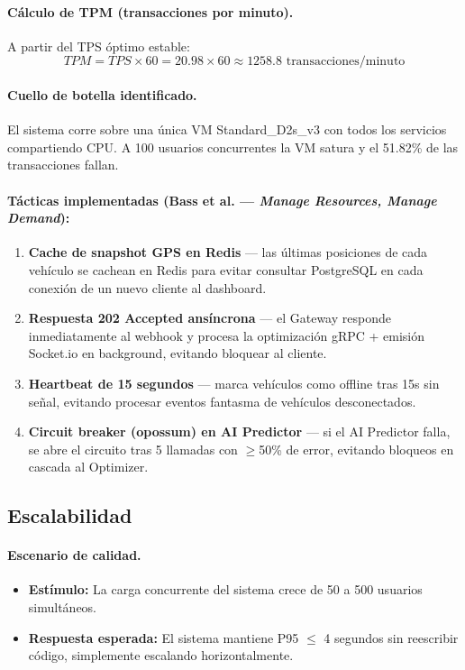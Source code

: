 \documentclass[12pt,a4paper,oneside]{article}
\begin{document}
\paragraph{C\'alculo de TPM (transacciones por minuto).} A partir del TPS \'optimo estable:
\[
TPM = TPS \times 60 = 20.98 \times 60 \approx 1258.8 \text{ transacciones/minuto}
\]

\paragraph{Cuello de botella identificado.} El sistema corre sobre una \'unica VM Standard\_D2s\_v3 con todos los servicios compartiendo CPU. A 100 usuarios concurrentes la VM satura y el 51.82\% de las transacciones fallan.

\paragraph{T\'acticas implementadas (Bass et al. --- \emph{Manage Resources, Manage Demand}):}
\begin{enumerate}[leftmargin=*]
  \item \textbf{Cache de snapshot GPS en Redis} --- las \'ultimas posiciones de cada veh\'iculo se cachean en Redis para evitar consultar PostgreSQL en cada conexi\'on de un nuevo cliente al dashboard.
  \item \textbf{Respuesta 202 Accepted ans\'incrona} --- el Gateway responde inmediatamente al webhook y procesa la optimizaci\'on gRPC + emisi\'on Socket.io en background, evitando bloquear al cliente.
  \item \textbf{Heartbeat de 15 segundos} --- marca veh\'iculos como offline tras 15s sin se\~nal, evitando procesar eventos fantasma de veh\'iculos desconectados.
  \item \textbf{Circuit breaker (opossum) en AI Predictor} --- si el AI Predictor falla, se abre el circuito tras 5 llamadas con $\geq$50\% de error, evitando bloqueos en cascada al Optimizer.
\end{enumerate}

\subsection{Escalabilidad}

\paragraph{Escenario de calidad.}
\begin{itemize}[leftmargin=*]
  \item \textbf{Est\'imulo:} La carga concurrente del sistema crece de 50 a 500 usuarios simult\'aneos.
  \item \textbf{Respuesta esperada:} El sistema mantiene P95 $\leq$ 4 segundos sin reescribir c\'odigo, simplemente escalando horizontalmente.
\end{itemize}
\end{document}
